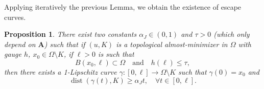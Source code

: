 \documentclass[12pt]{article}
\newtheorem{proposition}[theorem]{Proposition}
\theoremstyle{definition}
\theoremstyle{remark}
\numberwithin{equation}{section}
\DeclareMathOperator{\dist}{dist}
\newcommand{\dd}{\partial}
\newcommand{\A}{\mathbf{A}}
\begin{document}
Applying iteratively the previous Lemma, we obtain the existence of escape curves.

\begin{proposition}\label{PropJohnCurveLoc}
    There exist two constants $\alpha_J\in(0,1)$ and $\tau>0$ (which only depend on $\A$) such that if $(u,K)$ is
    a topological almost-minimizer in $\Omega$ with gauge $h$, $x_0\in\Omega\setminus K$, if $\ell > 0$ is such that
    \begin{equation}
        B(x_0,\ell) \subset \Omega \quad \text{and} \quad h(\ell) \leq \tau,
    \end{equation}
    then there exists a 1-Lipschitz curve $\gamma\colon[0,\ell]\longrightarrow\Omega\setminus K$ such that $\gamma(0)=x_0$ and
    \begin{equation}
        \label{eqeq24}
        \dist(\gamma(t),K)\geq \alpha_J t,\quad\forall t\in[0,\ell].
    \end{equation}
\end{proposition}
\end{document}
